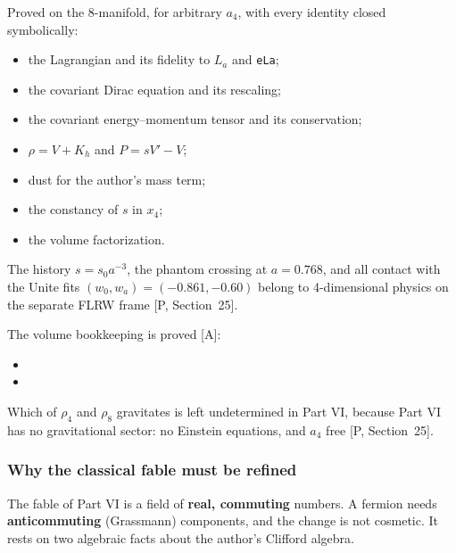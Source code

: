 \label{sec:3.1.12.9}
Proved on the 8-manifold, for arbitrary $a_4$, with every identity closed symbolically:
\begin{itemize}
  \item the Lagrangian and its fidelity to $L_a$ and \texttt{eLa};
  \item the covariant Dirac equation and its rescaling;
  \item the covariant energy--momentum tensor and its conservation;
  \item $\rho=V+K_h$ and $P=sV'-V$;
  \item dust for the author's mass term;
  \item the constancy of $s$ in $x_4$;
  \item the volume factorization.
\end{itemize}
The history $s=s_0a^{-3}$, the phantom crossing at $a=0.768$, and all contact with the Unite
fits $(w_0,w_a)=(-0.861,-0.60)$ belong to 4-dimensional physics on the separate FLRW frame
[P, Section~25].

The volume bookkeeping is proved [A]:
\begin{itemize}
  \item {}
  \item {}
\end{itemize}
Which of $\rho_4$ and $\rho_8$ gravitates is left undetermined in Part VI, because Part VI has no
gravitational sector: no Einstein equations, and $a_4$ free [P, Section~25].

\subsubsection{Why the classical fable must be refined}
\label{fnd:refine}\label{sec:3.1.13}

The fable of Part VI is a field of \textbf{real, commuting} numbers. A fermion needs
\textbf{anticommuting} (Grassmann) components, and the change is not cosmetic. It rests on two
algebraic facts about the author's Clifford algebra.

